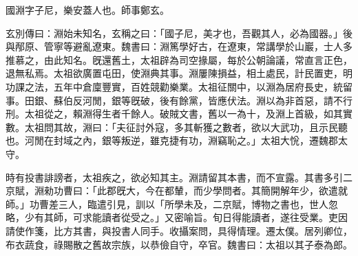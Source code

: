 
\begin{pinyinscope}
國淵字子尼，樂安蓋人也。師事鄭玄。

玄別傳曰：淵始未知名，玄稱之曰：「國子尼，美才也，吾觀其人，必為國器。」後與邴原、管寧等避亂遼東。魏書曰：淵篤學好古，在遼東，常講學於山巖，士人多推慕之，由此知名。旣還舊土，太祖辟為司空掾屬，每於公朝論議，常直言正色，退無私焉。太祖欲廣置屯田，使淵典其事。淵屢陳損益，相土處民，計民置吏，明功課之法，五年中倉廩豐實，百姓競勸樂業。太祖征關中，以淵為居府長史，統留事。田銀、蘇伯反河閒，銀等旣破，後有餘黨，皆應伏法。淵以為非首惡，請不行刑。太祖從之，賴淵得生者千餘人。破賊文書，舊以一為十，及淵上首級，如其實數。太祖問其故，淵曰：「夫征討外寇，多其斬獲之數者，欲以大武功，且示民聽也。河閒在封域之內，銀等叛逆，雖克捷有功，淵竊恥之。」太祖大恱，遷魏郡太守。

時有投書誹謗者，太祖疾之，欲必知其主。淵請留其本書，而不宣露。其書多引二京賦，淵勑功曹曰：「此郡旣大，今在都輦，而少學問者。其簡開解年少，欲遣就師。」功曹差三人，臨遣引見，訓以「所學未及，二京賦，博物之書也，世人忽略，少有其師，可求能讀者從受之。」又密喻旨。旬日得能讀者，遂往受業。吏因請使作箋，比方其書，與投書人同手。收攝案問，具得情理。遷太僕。居列卿位，布衣蔬食，祿賜散之舊故宗族，以恭儉自守，卒官。魏書曰：太祖以其子泰為郎。


\end{pinyinscope}